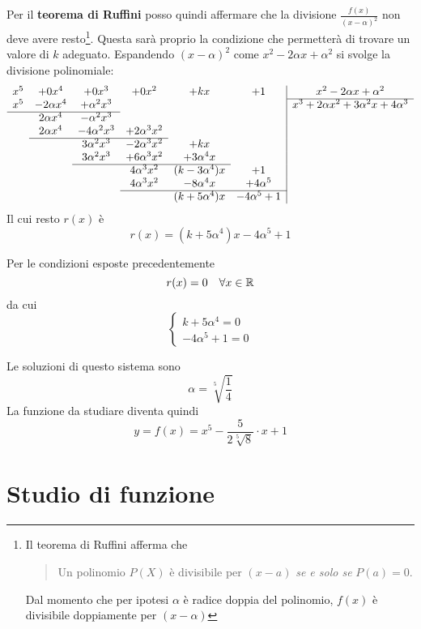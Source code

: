 Per il \textbf{teorema di Ruffini} \parencite[vol. 1, p. 415]{blu:1} posso quindi affermare che la divisione $\frac{f(x)}{(x-\alpha)^2}$ non deve avere resto\footnote{Il teorema di Ruffini afferma che
\begin{quotation}
Un polinomio $P(X)$ è divisibile per $(x-a)$ \textit{se e solo se} $P(a)=0$.
\end{quotation}
Dal momento che per ipotesi $\alpha$ è radice doppia del polinomio, $f(x)$ è divisibile doppiamente per $(x-\alpha)$}. Questa sarà proprio la condizione che permetterà di trovare un valore di $k$ adeguato.
Espandendo $(x-\alpha)^2$ come $x^2-2\alpha x+\alpha^2$ si svolge la divisione polinomiale:
\[
\begin{array}{cccccc|c}
x^5 & +0x^4 & +0x^3 & +0x^2 & +kx & +1  & x^2-2\alpha x+\alpha^2\\ \cline{7-7}
x^5 & -2\alpha x^4 & +\alpha^2x^3 & & & & x^3+2\alpha x^2+3\alpha^2x+4\alpha^3\\\cline{1-3}
& 2\alpha x^4 & -\alpha^2x^3 & & & & \\
& 2\alpha x^4 & -4\alpha^2x^3 & +2\alpha^3x^2 & & & \\
\cline{2-4}
& & 3\alpha^2x^3 & -2\alpha^3x^2 &+ kx & & \\
& & 3\alpha^2x^3 & +6\alpha^3x^2 & +3\alpha^4x & & \\
\cline{3-5}
& & & 4\alpha^3x^2 & (k-3\alpha^4)x & + 1& \\
& & & 4\alpha^3x^2 & -8\alpha^4x & +4\alpha^5 & \\
\cline{4-6}
& & & & (k+5\alpha^4)x & -4\alpha^5 + 1& 
\end{array}
\]
Il cui resto $r(x)$ è
\[
r(x)=(k+5\alpha^4)x -4\alpha^5 + 1
\]

Per le condizioni esposte precedentemente
\[
r(x)=0\quad \forall x\in \mathbb{R}
\]
da cui
\[
\begin{cases}
k+5\alpha^4=0\\
-4\alpha^5+1=0
\end{cases}
\]

Le soluzioni di questo sistema sono
\[
\alpha=\sqrt[5]{\frac{1}{4}}
\]
La funzione da studiare diventa quindi
\begin{equation}\label{eq:2}
y=f(x)=x^5-\frac{5}{2\sqrt[5]{8}}\cdot x+1
\end{equation}

\section{Studio di funzione}

